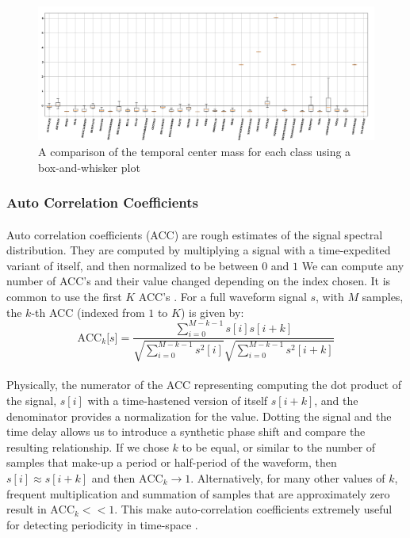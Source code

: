 \documentclass[12pt,letterpaper]{article}
\begin{document}
\begin{figure}[H]
\begin{center}
\includegraphics[scale=0.3]{../FiguresFeatures/TCM}
\end{center}
\caption{A comparison of the temporal center mass for each class using a box-and-whisker plot}
\label{fig-FeatureTCM}
\end{figure}


\subsubsection{Auto Correlation Coefficients}

\paragraph*{}Auto correlation coefficients (ACC) are rough estimates of the signal spectral distribution. They are computed by multiplying a signal with a time-expedited variant of itself, and then normalized to be between $0$ and $1$ We can compute any number of ACC's and their value changed depending on the index chosen. It is common to use the first $K$ ACC's \cite{Serizel}. For a full waveform signal $s$, with $M$ samples, the $k$-th ACC (indexed from $1$ to $K$) is given by:
\begin{equation}
\label{eqn-FeatureACC}
\text{ACC}_k\big[ s \big] = 
\frac{\sum_{i=0}^{M-k-1}s[i]s[i+k]} {\sqrt{\sum_{i=0}^{M-k-1}s^2[i]} 
\sqrt{\sum_{i=0}^{M-k-1}s^2[i+k]}}
\end{equation}

\paragraph*{}Physically, the numerator of the ACC representing computing the dot product of the signal, $s[i]$ with a time-hastened version of itself $s[i+k]$, and the denominator provides a normalization for the value. Dotting the signal and the time delay allows us to introduce a synthetic phase shift and compare the resulting relationship. If we chose $k$ to be equal, or similar to the number of samples that make-up a period or half-period of the waveform, then $s[i] \approx s[i+k]$ and then $\text{ACC}_k \rightarrow 1$. Alternatively, for many other values of $k$, frequent multiplication and summation of samples that are approximately zero result in $\text{ACC}_k << 1$. This make auto-correlation coefficients extremely useful for detecting periodicity in time-space \cite{Serizel}.
\end{document}
